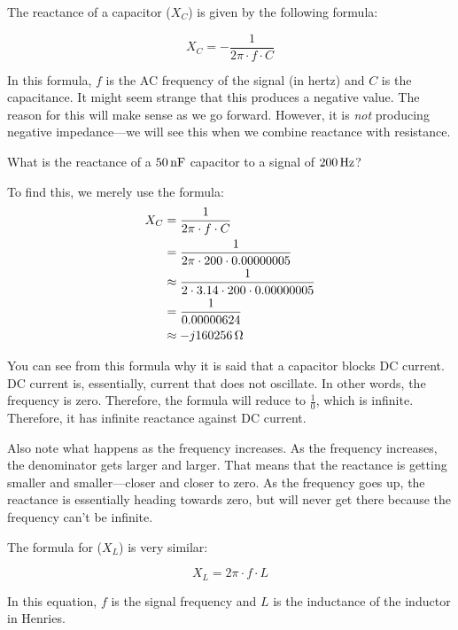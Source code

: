 The reactance of a capacitor ($X_C$) is given by the following formula:

\begin{equation}
\label{eqCapReactance}
X_C = -\frac{1}{2\pi\cdot f\cdot C}
\end{equation}

In this formula, $f$ is the AC frequency of the signal (in hertz) and $C$ is the capacitance.
It might seem strange that this produces a negative value. 
The reason for this will make sense as we go forward.
However, it is \emph{not} producing negative impedance---we will see this when we combine reactance with resistance.

\begin{exampleprob}
What is the reactance of a $50\,\si{\nano\farad}$ capacitor to a signal of $200\,\si{\hertz}$?

To find this, we merely use the formula:
\begin{align*}
X_C &= \frac{1}{2\pi\cdot f\cdot C} \\
 &= \frac{1}{2\pi\cdot 200\cdot 0.00000005} \\
 &\approx \frac{1}{2\cdot 3.14\cdot200\cdot 0.00000005} \\
 &= \frac{1}{0.00000624} \\
 &\approx -j160256\,\si{\ohm}
\end{align*}
\end{exampleprob}

You can see from this formula why it is said that a capacitor blocks DC current.
DC current is, essentially, current that does not oscillate.
In other words, the frequency is zero.
Therefore, the formula will reduce to $\frac{1}{0}$, which is infinite.
Therefore, it has infinite reactance against DC current.

Also note what happens as the frequency increases.
As the frequency increases, the denominator gets larger and larger.
That means that the reactance is getting smaller and smaller---closer and closer to zero.
As the frequency goes up, the reactance is essentially heading towards zero, but will never get there because the frequency can't be infinite.

The formula for  ($X_L$) is very similar:

\begin{equation}
\label{eqReactanceInductor}
X_L = 2\pi\cdot f\cdot L
\end{equation}

In this equation, $f$ is the signal frequency and $L$ is the inductance of the inductor in Henries.

